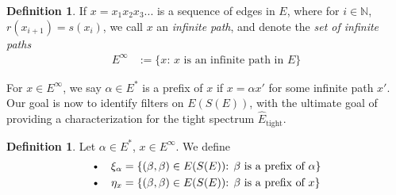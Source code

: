 \documentclass[12pt]{article}
\theoremstyle{definition}
\newtheorem{definition}[theorem]{Definition}
\begin{document}
\begin{definition}
    If $x = x_1 x_2 x_3 ...$ is a sequence of edges in $E$, where for $i \in \mathbb{N}$, 
    $r(x_{i+1}) = s(x_i)$, we call $x$ an \emph{infinite path}, and denote the \emph{set of infinite paths}
    \begin{align*}
        E^\infty &:= \{x\text{: $x$ is an infinite path in $E$}\}
    \end{align*}
\end{definition}
For $x \in E^\infty$, we say $\alpha \in E^*$ is a prefix of $x$ if $x = \alpha x'$
for some infinite path $x'$. Our goal is now to identify filters on $E(S(E))$, with
the ultimate goal of providing a characterization for the tight spectrum $\hat{E}_\text{tight}$.

\begin{definition}
    Let $\alpha \in E^*$, $x \in E^\infty$. We define
    \begin{align*}
        \text{\textbullet \quad} \xi_\alpha &= \{(\beta, \beta) \in E(S(E))\text{: $\beta$ is a prefix of $\alpha$}\} \\
        \text{\textbullet \quad} \eta_x &= \{(\beta, \beta) \in E(S(E))\text{: $\beta$ is a prefix of $x$}\}
    \end{align*}
\end{definition}
\end{document}
